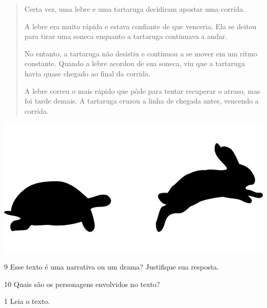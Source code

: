 \begin{minipage}{.5\textwidth}
\begin{quote}
Certa vez, uma lebre e uma tartaruga decidiram apostar uma corrida.

A lebre era muito rápida e estava confiante de que venceria. Ela se
deitou para tirar uma soneca enquanto a tartaruga continuava a andar.

No entanto, a tartaruga não desistiu e continuou a se mover em um ritmo
constante. Quando a lebre acordou de sua soneca, viu que a tartaruga
havia quase chegado ao final da corrida.

A lebre correu o mais rápido que pôde para tentar recuperar o atraso,
mas foi tarde demais. A tartaruga cruzou a linha de chegada antes,
vencendo a corrida.
\end{quote}
\end{minipage}
\begin{minipage}{.5\textwidth}
\includegraphics[width=\textwidth]{./imgs/img6.png}
\end{minipage}

\num{9} Esse texto é uma narrativa ou um drama? Justifique sua resposta.


\num{10} Quais são os personagens envolvidos no texto?


\pagebreak


\num{1} Leia o texto.

